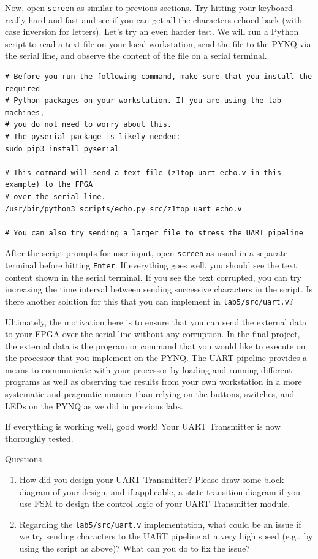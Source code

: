 \documentclass[11pt]{article}
\makeatletter
\renewcommand{\subsection}
{\@startsection {subsection}{1}{0pt}
 {-1ex}
 {0.5ex}
 {\bfseries\normalsize}}
\makeatother
\begin{document}
Now, open \verb|screen| as similar to previous sections. Try hitting your keyboard really hard and fast and see if you can get all the characters echoed back (with case inversion for letters). Let's try an even harder test. We will run a Python script to read a text file on your local workstation, send the file to the PYNQ via the serial line, and observe the content of the file on a serial terminal.

\begin{verbatim}
# Before you run the following command, make sure that you install the required
# Python packages on your workstation. If you are using the lab machines,
# you do not need to worry about this.
# The pyserial package is likely needed:
sudo pip3 install pyserial

# This command will send a text file (z1top_uart_echo.v in this example) to the FPGA
# over the serial line.
/usr/bin/python3 scripts/echo.py src/z1top_uart_echo.v

# You can also try sending a larger file to stress the UART pipeline
\end{verbatim}

After the script prompts for user input, open \verb|screen| as usual in a separate terminal before hitting \texttt{Enter}. If everything goes well, you should see the text content shown in the serial terminal. If you see the text corrupted, you can try increasing the time interval between sending successive characters in the script. Is there another solution for this that you can implement in \verb|lab5/src/uart.v|?

Ultimately, the motivation here is to ensure that you can send the external data to your FPGA over the serial line without any corruption. In the final project, the external data is the program or command that you would like to execute on the processor that you implement on the PYNQ. The UART pipeline provides a means to communicate with your processor by loading and running different programs as well as observing the results from your own workstation in a more systematic and pragmatic manner than relying on the buttons, switches, and LEDs on the PYNQ as we did in previous labs.

If everything is working well, good work! Your UART Transmitter is now thoroughly tested.

\subsection{Questions}\label{sec:Q1}
\begin{enumerate}
\item How did you design your UART Transmitter? Please draw some block diagram of your design, and if applicable, a state transition diagram if you use FSM to design the control logic of your UART Transmitter module.
\item Regarding the \verb|lab5/src/uart.v| implementation, what could be an issue if we try sending characters to the UART pipeline at a very high speed (e.g., by using the script as above)? What can you do to fix the issue?
\end{enumerate}
\end{document}

